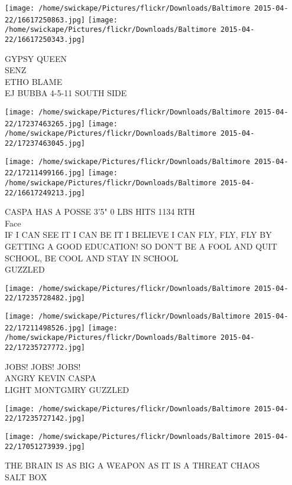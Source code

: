 \documentclass[10pt,letterpaper]{article}
\begin{document}
\texttt{[image: /home/swickape/Pictures/flickr/Downloads/Baltimore 2015-04-22/16617250863.jpg]}
\texttt{[image: /home/swickape/Pictures/flickr/Downloads/Baltimore 2015-04-22/16617250343.jpg]}

GYPSY QUEEN\\
SENZ\\
ETHO BLAME\\
EJ BUBBA 4{-}5{-}11 SOUTH SIDE\\
\pagebreak

\texttt{[image: /home/swickape/Pictures/flickr/Downloads/Baltimore 2015-04-22/17237463265.jpg]}
\texttt{[image: /home/swickape/Pictures/flickr/Downloads/Baltimore 2015-04-22/17237463045.jpg]}

\texttt{[image: /home/swickape/Pictures/flickr/Downloads/Baltimore 2015-04-22/17211499166.jpg]}
\texttt{[image: /home/swickape/Pictures/flickr/Downloads/Baltimore 2015-04-22/16617249213.jpg]}

CASPA HAS A POSSE 3'5" 0 LBS HITS 1134 RTH\\
Face\\
IF I CAN SEE IT I CAN BE IT I BELIEVE I CAN FLY, FLY, FLY BY GETTING A GOOD EDUCATION!  SO DON'T BE A FOOL AND QUIT SCHOOL, BE COOL AND STAY IN SCHOOL\\
GUZZLED\\
\pagebreak

\texttt{[image: /home/swickape/Pictures/flickr/Downloads/Baltimore 2015-04-22/17235728482.jpg]}

\vspace{0.25in}
\texttt{[image: /home/swickape/Pictures/flickr/Downloads/Baltimore 2015-04-22/17211498526.jpg]}
\texttt{[image: /home/swickape/Pictures/flickr/Downloads/Baltimore 2015-04-22/17235727772.jpg]}

JOBS!  JOBS!  JOBS!\\
ANGRY KEVIN CASPA\\
LIGHT MONTGMRY GUZZLED\\
\pagebreak

\texttt{[image: /home/swickape/Pictures/flickr/Downloads/Baltimore 2015-04-22/17235727142.jpg]}

\vspace{0.25in}
\texttt{[image: /home/swickape/Pictures/flickr/Downloads/Baltimore 2015-04-22/17051273939.jpg]}

THE BRAIN IS AS BIG A WEAPON AS IT IS A THREAT CHAOS\\
SALT BOX\\
\pagebreak
\end{document}
